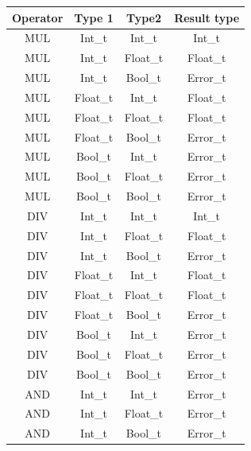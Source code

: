 \begin{figure}[H]
    \centering
    \begin{tabular}{cccc}
        \toprule
        \textbf{Operator} & \textbf{Type 1} & \textbf{Type2} & \textbf{Result type}\\
        \midrule MUL & Int\_t & Int\_t      & Int\_t \\
        \midrule MUL & Int\_t & Float\_t    & Float\_t \\
        \midrule MUL & Int\_t & Bool\_t     & Error\_t \\

        \midrule MUL & Float\_t & Int\_t    & Float\_t \\
        \midrule MUL & Float\_t & Float\_t  & Float\_t \\
        \midrule MUL & Float\_t & Bool\_t   & Error\_t \\

        \midrule MUL & Bool\_t & Int\_t     & Error\_t \\
        \midrule MUL & Bool\_t & Float\_t   & Error\_t \\
        \midrule MUL & Bool\_t & Bool\_t    & Error\_t \\

        \midrule DIV & Int\_t & Int\_t      & Int\_t \\
        \midrule DIV & Int\_t & Float\_t    & Float\_t \\
        \midrule DIV & Int\_t & Bool\_t     & Error\_t \\

        \midrule DIV & Float\_t & Int\_t    & Float\_t \\
        \midrule DIV & Float\_t & Float\_t  & Float\_t \\
        \midrule DIV & Float\_t & Bool\_t   & Error\_t \\

        \midrule DIV & Bool\_t & Int\_t     & Error\_t \\
        \midrule DIV & Bool\_t & Float\_t   & Error\_t \\
        \midrule DIV & Bool\_t & Bool\_t    & Error\_t \\

        \midrule AND & Int\_t & Int\_t      & Error\_t \\
        \midrule AND & Int\_t & Float\_t    & Error\_t \\
        \midrule AND & Int\_t & Bool\_t     & Error\_t \\


\end{tabular}
\end{figure}
